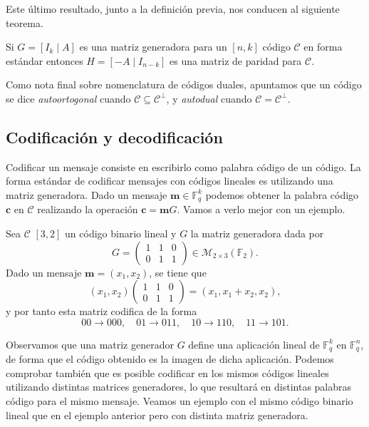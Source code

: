 Este último resultado, junto a la definición previa, nos conducen al siguiente teorema. 

\begin{theorem}
  Si \(G = [I_k \mid A]\) es una matriz generadora para un \([n, k]\) código \(\mathcal C\) en forma estándar entonces \(H = [-A \mid I_{n-k}]\) es una matriz de paridad para \(\mathcal C\).
\end{theorem}

Como nota final sobre nomenclatura de códigos duales, apuntamos que un código se dice \textit{autoortogonal} cuando \(\mathcal C \subseteq \mathcal C^{\perp}\), y \textit{autodual} cuando \(\mathcal C = \mathcal C^{\perp}\).

\subsection{Codificación y decodificación}

Codificar un mensaje consiste en escribirlo como palabra código de un código.
La forma estándar de codificar mensajes con códigos lineales es utilizando una matriz generadora.
Dado un mensaje \(\mathbf{m} \in \mathbb F_q^k\) podemos obtener la palabra código \(\mathbf{c}\) en \(\mathcal C\) realizando la operación \(\mathbf{c}= \mathbf{m}G\).
Vamos a verlo mejor con un ejemplo.

\begin{example}
  Sea \(\mathcal C\) \([3, 2]\) un código binario lineal y \(G\) la matriz generadora dada por 
  \[
    G = \begin{pmatrix}
      1 & 1 & 0 \\ 0 & 1 & 1
    \end{pmatrix} \in \mathcal M_{2 \times 3}(\mathbb F_2).
  \]
  Dado un mensaje \(\mathbf{m} = (x_1, x_2)\), se tiene que \[(x_1, x_2) \begin{pmatrix}
    1 & 1 & 0 \\ 0 & 1 & 1
  \end{pmatrix} = (x_1, x_1 + x_2, x_2),\] y por tanto esta matriz codifica de la forma \[00 \to 000, \quad 01 \to 011,\quad 10 \to 110,\quad 11 \to 101.\]
\end{example}

Observamos que una matriz generador \(G\) define una aplicación lineal de \(\mathbb F_q^k\) en \(\mathbb F_q^n\), de forma que el código obtenido es la imagen de dicha aplicación.
Podemos comprobar también que es posible codificar en los mismos códigos lineales utilizando distintas matrices generadores, lo que resultará en distintas palabras código para el mismo mensaje.
Veamos un ejemplo con el mismo código binario lineal que en el ejemplo anterior pero con distinta matriz generadora.

